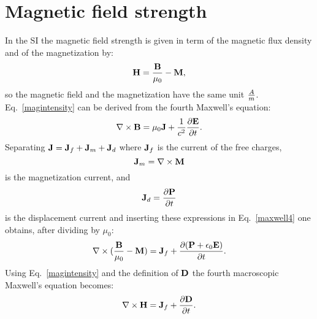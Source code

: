 \documentclass[12pt,a4paper]{article}
\begin{document}
\section{\color{coral}Magnetic field strength}
In the SI the magnetic field strength is given in term of the
magnetic flux density and of the magnetization by:
\begin{equation}
{\bf H}={{\bf B} \over \mu_0} - {\bf M},
\label{magintensity}
\end{equation}
so the magnetic field and the magnetization have the same
unit ${A \over m}$.\\
Eq.~\ref{magintensity} can be derived from the fourth Maxwell's equation:
\begin{equation}
\nabla \times {\bf B}= \mu_0 {\bf J} + {1\over c^2} {\partial {\bf E} \over
\partial t}.
\label{maxwell4}
\end{equation}
Separating ${\bf J}={\bf J}_f + {\bf J}_m + {\bf J}_d$ where
${\bf J}_f$ is the current of the free charges, 
\begin{equation}
{\bf J}_m=\nabla \times {\bf M}
\end{equation}
is the magnetization current, and
\begin{equation}
{\bf J}_d={\partial {\bf P} \over \partial t}
\end{equation}
is the displacement current and inserting these expressions in 
Eq.~\ref{maxwell4} one obtains, after dividing by $\mu_0$:
\begin{equation}
\nabla \times ({{\bf B}\over \mu_0}-{\bf M})= {\bf J}_f + 
{\partial ({\bf P} + \epsilon_0 {\bf E} )\over
\partial t}.
\end{equation}
Using Eq.~\ref{magintensity} and the definition of ${\bf D}$ the
fourth macroscopic Maxwell's equation becomes:
\begin{equation}
\nabla \times {\bf H}= {\bf J}_f + 
{\partial {\bf D}\over
\partial t}.
\end{equation}
\\
\end{document}
